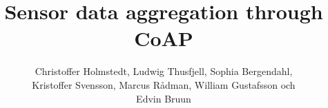 \documentclass[12pt,a4paper,titlepage]{article}
\begin{document}
\title{Sensor data aggregation through CoAP} 
\author{
Christoffer Holmstedt, Ludwig Thusfjell, Sophia Bergendahl, \\
Kristoffer Svensson, Marcus Rådman, William Gustafsson och \\
Edvin Bruun
}
\maketitle

\setcounter{page}{2}





\end{document}
